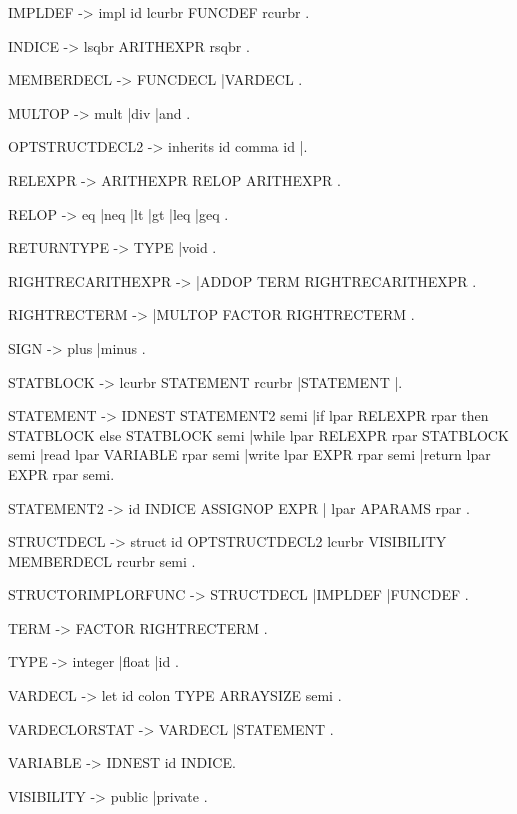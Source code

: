 \documentclass{article}
\begin{document}
IMPLDEF -> impl id lcurbr FUNCDEF rcurbr .

INDICE -> lsqbr ARITHEXPR rsqbr .

MEMBERDECL -> FUNCDECL 
             |VARDECL .

MULTOP -> mult 
         |div 
         |and .

OPTSTRUCTDECL2 -> inherits id comma id 
                 |.


RELEXPR -> ARITHEXPR RELOP ARITHEXPR .

RELOP -> eq 
        |neq 
        |lt 
        |gt 
        |leq 
        |geq .

RETURNTYPE -> TYPE 
             |void .

RIGHTRECARITHEXPR -> 
                    |ADDOP TERM RIGHTRECARITHEXPR .

RIGHTRECTERM -> 
               |MULTOP FACTOR RIGHTRECTERM .


SIGN -> plus 
       |minus .

STATBLOCK -> lcurbr STATEMENT rcurbr 
            |STATEMENT 
            |.

STATEMENT -> IDNEST STATEMENT2 semi
            |if lpar RELEXPR rpar then STATBLOCK else STATBLOCK semi 
            |while lpar RELEXPR rpar STATBLOCK semi 
            |read lpar VARIABLE rpar semi 
            |write lpar EXPR rpar semi 
            |return lpar EXPR rpar semi.


STATEMENT2 ->  id INDICE ASSIGNOP EXPR 
	     | lpar APARAMS rpar .



STRUCTDECL -> struct id OPTSTRUCTDECL2 lcurbr VISIBILITY MEMBERDECL rcurbr semi .

STRUCTORIMPLORFUNC -> STRUCTDECL 
                     |IMPLDEF 
                     |FUNCDEF .

TERM -> FACTOR RIGHTRECTERM .

TYPE -> integer 
       |float 
       |id .

VARDECL -> let id colon TYPE ARRAYSIZE semi .

VARDECLORSTAT -> VARDECL 
                |STATEMENT .

VARIABLE ->  IDNEST id INDICE.

VISIBILITY -> public 
             |private .
\end{document}
